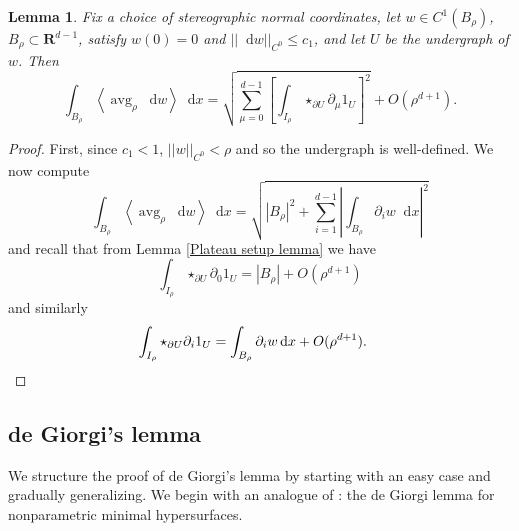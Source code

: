 \documentclass[reqno,10pt]{amsart}
\newcommand{\RR}{\mathbf{R}}
\DeclareMathOperator{\avg}{avg}
\newcommand*\dif{\mathop{}\!\mathrm{d}}
\def\Japan#1{\left \langle #1 \right \rangle}
\newtheorem{lemma}[theorem]{Lemma}
\theoremstyle{definition}
\numberwithin{equation}{section}
\begin{document}
\begin{lemma}\label{compare to excess}
Fix a choice of stereographic normal coordinates, let $w \in C^1(B_\rho)$, $B_\rho \subset \RR^{d - 1}$, satisfy $w(0) = 0$ and $||\dif w||_{C^0} \leq c_1$, and let $U$ be the undergraph of $w$. Then
$$\int_{B_\rho} \Japan{\avg_\rho \dif w} \dif x = \sqrt{\sum_{\mu = 0}^{d - 1} \left[\int_{I_\rho} \star_{\partial U} \partial_\mu 1_U\right]^2} + O(\rho^{d + 1}).$$
\end{lemma}
\begin{proof}
First, since $c_1 < 1$, $||w||_{C^0} < \rho$ and so the undergraph is well-defined.
We now compute 
$$\int_{B_\rho} \Japan{\avg_\rho \dif w} \dif x = \sqrt{|B_\rho|^2 + \sum_{i=1}^{d - 1}\left|\int_{B_\rho} \partial_i w \dif x\right|^2}$$
and recall that from Lemma \ref{Plateau setup lemma} we have 
$$\int_{I_\rho} \star_{\partial U} \partial_0 1_U = |B_\rho| + O(\rho^{d + 1})$$
and similarly 
\begin{align*}
\int_{I_\rho} \star_{\partial U} \partial_i 1_U &= \int_{B_\rho} \partial_i w \dif x + O(\rho^{d + 1}). \qedhere 
\end{align*}
\end{proof}


\subsection{de Giorgi's lemma} 
We structure the proof of de Giorgi's lemma by starting with an easy case and gradually generalizing.
We begin with an analogue of \cite[Teorema 4.3]{Miranda66}: the de Giorgi lemma for nonparametric minimal hypersurfaces.
\end{document}
